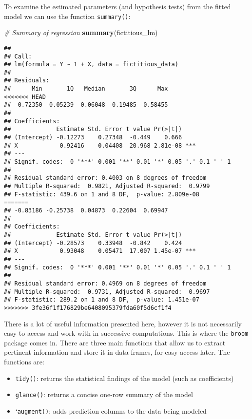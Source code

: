 \documentclass[
]{book}
\newenvironment{Shaded}{\begin{snugshade}}{\end{snugshade}}
\newcommand{\CommentTok}[1]{\textcolor[rgb]{0.56,0.35,0.01}{\textit{#1}}}
\newcommand{\KeywordTok}[1]{\textcolor[rgb]{0.13,0.29,0.53}{\textbf{#1}}}
\newcommand{\NormalTok}[1]{#1}
\providecommand{\tightlist}{%
  \setlength{\itemsep}{0pt}\setlength{\parskip}{0pt}}
\begin{document}
To examine the estimated parameters (and hypothesis tests) from the fitted model we can use the function \texttt{summary()}:

\begin{Shaded}
\begin{Highlighting}[]
\CommentTok{# Summary of regression }
\KeywordTok{summary}\NormalTok{(fictitious_lm)}
\end{Highlighting}
\end{Shaded}

\begin{verbatim}
## 
## Call:
## lm(formula = Y ~ 1 + X, data = fictitious_data)
## 
## Residuals:
##      Min       1Q   Median       3Q      Max 
<<<<<<< HEAD
## -0.72350 -0.05239  0.06048  0.19485  0.58455 
## 
## Coefficients:
##             Estimate Std. Error t value Pr(>|t|)    
## (Intercept) -0.12273    0.27348  -0.449    0.666    
## X            0.92416    0.04408  20.968 2.81e-08 ***
## ---
## Signif. codes:  0 '***' 0.001 '**' 0.01 '*' 0.05 '.' 0.1 ' ' 1
## 
## Residual standard error: 0.4003 on 8 degrees of freedom
## Multiple R-squared:  0.9821, Adjusted R-squared:  0.9799 
## F-statistic: 439.6 on 1 and 8 DF,  p-value: 2.809e-08
=======
## -0.83186 -0.25738  0.04873  0.22604  0.69947 
## 
## Coefficients:
##             Estimate Std. Error t value Pr(>|t|)    
## (Intercept) -0.28573    0.33948  -0.842    0.424    
## X            0.93048    0.05471  17.007 1.45e-07 ***
## ---
## Signif. codes:  0 '***' 0.001 '**' 0.01 '*' 0.05 '.' 0.1 ' ' 1
## 
## Residual standard error: 0.4969 on 8 degrees of freedom
## Multiple R-squared:  0.9731, Adjusted R-squared:  0.9697 
## F-statistic: 289.2 on 1 and 8 DF,  p-value: 1.451e-07
>>>>>>> 3fe36f1f176829be6408095379fda60f5d6cf1f4
\end{verbatim}

There is a lot of useful information presented here, however it is not necessarily easy to access and work with in successive computations. This is where the \texttt{broom} package comes in. There are three main functions that allow us to extract pertinent information and store it in data frames, for easy access later. The functions are:

\begin{itemize}
\tightlist
\item
  \texttt{tidy()}: returns the statistical findings of the model (such as coefficients)
\item
  \texttt{glance()}: returns a concise one-row summary of the model
\item
  `\texttt{augment()}: adds prediction columns to the data being modeled
\end{itemize}
\end{document}
